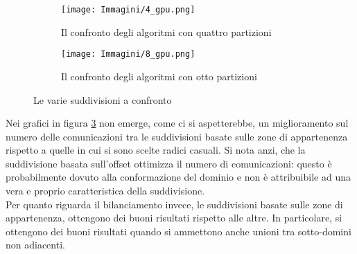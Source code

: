 {%
\begin{figure}[H]
	\centering
	\begin{subfigure}{1.0\textwidth}
		\centering
		\texttt{[image: Immagini/4\_gpu.png]}
		\caption{Il confronto degli algoritmi con quattro partizioni\newline}
		\label{fig:confronto_4}
	\end{subfigure}
	\begin{subfigure}{1.0\textwidth}
		\centering
		\texttt{[image: Immagini/8\_gpu.png]}
		\caption{Il confronto degli algoritmi con otto partizioni}
		\label{fig:confronto_8}
	\end{subfigure}

	\caption{Le varie suddivisioni a confronto}
		\label{fig:comm_confronto}
\end{figure}


Nei grafici in figura \ref{fig:comm_confronto} non emerge, come ci si aspetterebbe, un miglioramento sul numero delle comunicazioni tra le suddivisioni basate sulle zone di appartenenza rispetto a quelle in cui si sono scelte radici casuali. Si nota anzi, che la suddivisione basata sull'offset ottimizza il numero di comunicazioni: questo è probabilmente dovuto alla conformazione del dominio e non è attribuibile ad una vera e proprio caratteristica della suddivisione.\\
Per quanto riguarda il bilanciamento invece, le suddivisioni basate sulle zone di appartenenza, ottengono dei buoni risultati rispetto alle altre. In particolare, si ottengono dei buoni risultati quando si ammettono anche unioni tra sotto-domini non adiacenti.

}
